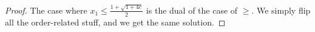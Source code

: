 \documentclass{article}
\begin{document}
\begin{enumerate}
\begin{proof}
    
    

    The case where $x_1 \leq \frac{1+\sqrt{1+4c}}{2}$ is the dual of
    the case of $\geq$. We simply flip all the order-related stuff,
    and we get the same solution.
  \end{proof}
\end{enumerate}
\end{document}
